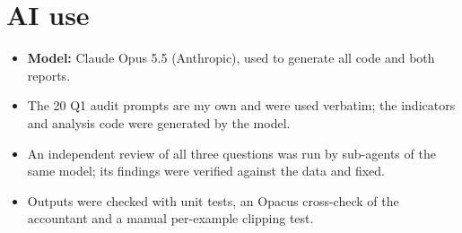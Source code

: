 \documentclass[10pt,a4paper]{article}
\begin{document}
\section*{AI use}
\begin{itemize}
\item \textbf{Model:} Claude Opus 5.5 (Anthropic), used to generate all code and both reports.
\item The 20 Q1 audit prompts are my own and were used verbatim; the indicators and analysis code were generated by the model.
\item An independent review of all three questions was run by sub-agents of the same model; its findings were verified against the data and fixed.
\item Outputs were checked with unit tests, an Opacus cross-check of the accountant and a manual per-example clipping test.
\end{itemize}
\end{document}
